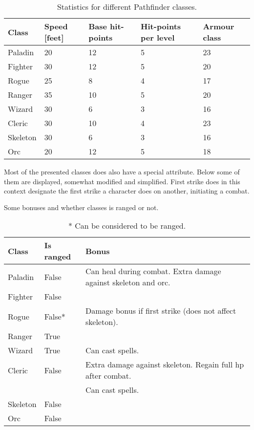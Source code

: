 \documentclass[a4paper,12pt]{article}
\begin{document}
\begin{table}[H] 
	\centering
	\caption{Statistics for different Pathfinder classes. \label{table:Stats}}
	\begin{tabular}{@{}lllll@{}}
	\toprule
	Class & Speed [feet] & Base hit-points & Hit-points per level & Armour class \\ \midrule
 	Paladin & 20 	& 12 	& 5 	& 23 	\\
 	Fighter & 30 	& 12 	& 5 	& 20 	\\
 	Rogue 	& 25	& 8 	& 4 	& 17 	\\
 	Ranger 	& 35 	& 10 	& 5 	& 20 	\\
 	Wizard 	& 30 	& 6 	& 3 	& 16 	\\
 	Cleric 	& 30 	& 10 	& 4 	& 23 	\\
 	Skeleton& 30 	& 6 	& 3 	& 16 	\\
 	Orc 	& 20 	& 12 	& 5 	& 18 	\\ \bottomrule
	\end{tabular}
\end{table}

\noindent
Most of the presented classes does also have a special attribute. Below some of them are displayed, somewhat modified and simplified.
First strike does in this context designate the first strike a character does on another, initiating a combat.

\begin{table}[H] 
	\centering
	\caption{Some bonuses and whether classes is ranged or not.\label{table:Bonuses}}
	\begin{tabular}{@{}lll@{}}
	\toprule
	Class & Is ranged & Bonus \\ \midrule
 	Paladin & False 	& Can heal during combat. Extra damage against skeleton and orc.	\\
 	Fighter & False 	& \\
 	Rogue 	& False*	& Damage bonus if first strike (does not affect skeleton). 	\\
 	Ranger 	& True 		& \\
 	Wizard 	& True 		& Can cast spells.\\
 	Cleric 	& False 	& Extra damage against skeleton. Regain full hp after combat. \\
 		& & Can cast spells.\\
 	Skeleton& False 	& \\
 	Orc 	& False 	& \\ \bottomrule
	\end{tabular}
	\caption*{* Can be considered to be ranged.}
\end{table}
\end{document}
